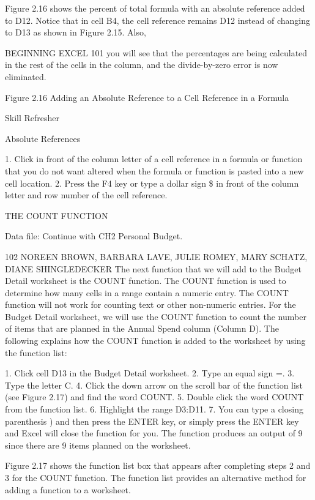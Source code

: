 Figure 2.16 shows the percent of total formula with an absolute reference added to D12. Notice that
in cell B4, the cell reference remains D12 instead of changing to D13 as shown in Figure 2.15. Also,

BEGINNING EXCEL 101
you will see that the percentages are being calculated in the rest of the cells in the column, and the
divide-by-zero error is now eliminated.




Figure 2.16 Adding an Absolute Reference to a Cell Reference in a Formula




Skill Refresher


Absolute References

1. Click in front of the column letter of a cell reference in a formula or function that you do not want altered
when the formula or function is pasted into a new cell location.
2. Press the F4 key or type a dollar sign \$ in front of the column letter and row number of the cell reference.



THE COUNT FUNCTION

Data file: Continue with CH2 Personal Budget.

102 NOREEN BROWN, BARBARA LAVE, JULIE ROMEY, MARY SCHATZ, DIANE SHINGLEDECKER
The next function that we will add to the Budget Detail worksheet is the COUNT function. The
COUNT function is used to determine how many cells in a range contain a numeric entry. The
COUNT function will not work for counting text or other non-numeric entries. For the Budget
Detail worksheet, we will use the COUNT function to count the number of items that are planned in
the Annual Spend column (Column D). The following explains how the COUNT function is added to
the worksheet by using the function list:

1. Click cell D13 in the Budget Detail worksheet.
2. Type an equal sign =.
3. Type the letter C.
4. Click the down arrow on the scroll bar of the function list (see Figure 2.17) and find the word
COUNT.
5. Double click the word COUNT from the function list.
6. Highlight the range D3:D11.
7. You can type a closing parenthesis ) and then press the ENTER key, or simply press the ENTER
key and Excel will close the function for you. The function produces an output of 9 since there
are 9 items planned on the worksheet.

Figure 2.17 shows the function list box that appears after completing steps 2 and 3 for the COUNT
function. The function list provides an alternative method for adding a function to a worksheet.




